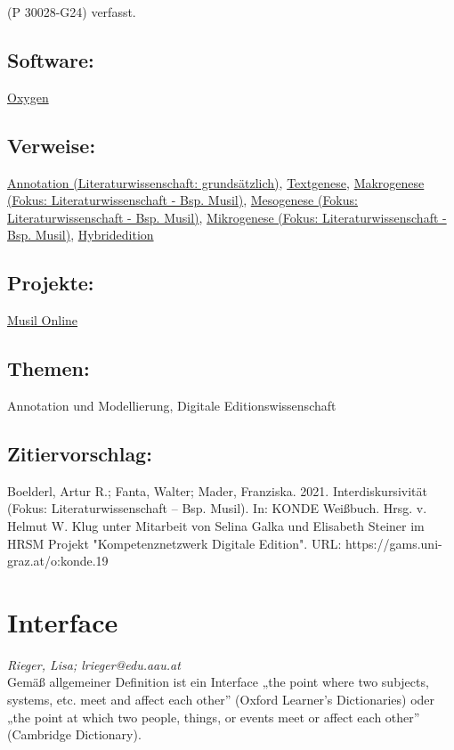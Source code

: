\documentclass{article}
\begin{document}
                  (P 30028-G24) verfasst.\subsection*{Software:}\href{http://oxygenxml.com/}{Oxygen}\subsection*{Verweise:}\href{https://gams.uni-graz.at/o:konde.17}{Annotation (Literaturwissenschaft:
                           grundsätzlich)}, \href{https://gams.uni-graz.at/o:konde.28}{Textgenese}, \href{https://gams.uni-graz.at/o:konde.23}{Makrogenese (Fokus:
                           Literaturwissenschaft - Bsp. Musil)}, \href{https://gams.uni-graz.at/o:konde.24}{Mesogenese (Fokus:
                           Literaturwissenschaft - Bsp. Musil)}, \href{https://gams.uni-graz.at/o:konde.26}{Mikrogenese (Fokus:
                           Literaturwissenschaft - Bsp. Musil)}, \href{https://gams.uni-graz.at/o:konde.96}{Hybridedition}\subsection*{Projekte:}\href{http://musilonline.at}{Musil Online}\subsection*{Themen:}Annotation und Modellierung, Digitale Editionswissenschaft\subsection*{Zitiervorschlag:}Boelderl, Artur R.; Fanta, Walter; Mader, Franziska. 2021. Interdiskursivität (Fokus: Literaturwissenschaft – Bsp.
               Musil). In: KONDE Weißbuch. Hrsg. v. Helmut W. Klug unter Mitarbeit von Selina Galka und Elisabeth Steiner im HRSM Projekt "Kompetenznetzwerk Digitale Edition". URL: https://gams.uni-graz.at/o:konde.19\newpage\section*{Interface} \emph{Rieger, Lisa; lrieger@edu.aau.at }\\
        
    Gemäß allgemeiner Definition ist ein Interface „the point where two subjects,
                  systems, etc. meet and affect each other” (Oxford Learner’s
                     Dictionaries) oder „the point at which two people, things, or events
                  meet or affect each other” (Cambridge Dictionary). \\
            
\end{document}
